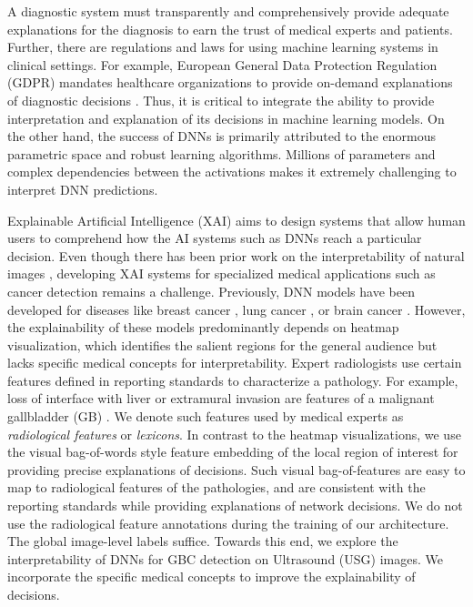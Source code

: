 \par A diagnostic system must transparently and comprehensively provide adequate explanations for the diagnosis to earn the trust of medical experts and patients. Further, there are regulations and laws for using machine learning systems in clinical settings. For example, European General Data Protection Regulation (GDPR) mandates healthcare organizations to provide on-demand explanations of diagnostic decisions \cite{hoofnagle2019european}. Thus, it is critical to integrate the ability to provide interpretation and explanation of its decisions in machine learning models. On the other hand, the success of DNNs is primarily attributed to the enormous parametric space and robust learning algorithms. Millions of parameters and complex dependencies between the activations makes it extremely challenging to interpret DNN predictions.  

\par Explainable Artificial Intelligence (XAI) aims to design systems that allow human users to comprehend how the AI systems such as DNNs reach a particular decision. Even though there has been prior work on the interpretability of natural images \cite{bau2017network, monga2021algorithm}, developing XAI systems for specialized medical applications such as cancer detection remains a challenge. Previously, DNN models have been developed for diseases like breast cancer \cite{bejnordi2017diagnostic, lamy2019explainable}, lung cancer \cite{coudray2018classification}, or brain cancer \cite{ismael2020enhanced, pg-cam}. However, the explainability of these models predominantly depends on heatmap visualization, which identifies the salient regions for the general audience but lacks specific medical concepts for interpretability. Expert radiologists use certain features defined in reporting standards to characterize a pathology. For example, loss of interface with liver or extramural invasion are features of a malignant gallbladder (GB) \cite{gb-rads-paper}. We denote such features used by medical experts as \emph{radiological features} or \emph{lexicons}. In contrast to the heatmap visualizations, we use the visual bag-of-words style feature embedding of the local region of interest for providing precise explanations of decisions. Such visual bag-of-features are easy to map to radiological features of the pathologies, and are consistent with the reporting standards while providing explanations of network decisions. We do not use the radiological feature annotations during the training of our architecture. The global image-level labels suffice. Towards this end, we explore the interpretability of DNNs for GBC detection on Ultrasound (USG) images. We incorporate the specific medical concepts to improve the explainability of decisions. %

